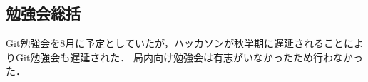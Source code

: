 \subsection*{勉強会総括}


Git勉強会を8月に予定としていたが，ハッカソンが秋学期に遅延されることによりGit勉強会も遅延された．
局内向け勉強会は有志がいなかったため行わなかった．
